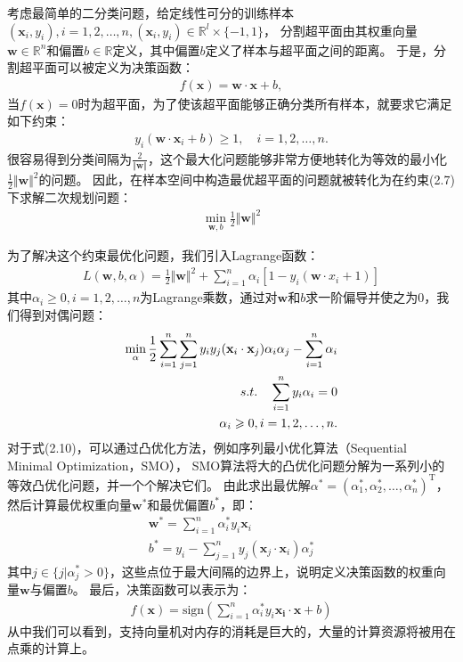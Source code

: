 考虑最简单的二分类问题，给定线性可分的训练样本$(\mathbf{x}_i,y_i),i=1,2,\ldots,n,(\mathbf{x}_i,y_i)\in\mathbb{R}^l\times\{-1,1\}$，
分割超平面由其权重向量$\mathbf{w}\in\mathbb{R}^n$和偏置$b\in\mathbb{R}$定义，其中偏置$b$定义了样本与超平面之间的距离。
于是，分割超平面可以被定义为决策函数：
\begin{align}
    f(\mathbf{x})=\mathbf{w}\cdot\mathbf{x}+b,
\end{align}
当$f(\mathbf{x})=0$时为超平面，为了使该超平面能够正确分类所有样本，就要求它满足如下约束：
\begin{align}
    y_i(\mathbf{w}\cdot\mathbf{x}_i+b)\geq1,\quad i=1,2,\ldots,n.
\end{align}
很容易得到分类间隔为$\frac{2}{\Vert\mathbf{w}\Vert}$，这个最大化问题能够非常方便地转化为等效的最小化$\frac{1}{2}\Vert\mathbf{w}\Vert^2$的问题。
因此，在样本空间中构造最优超平面的问题就被转化为在约束(2.7)下求解二次规划问题：
\begin{align}
    \min_{\mathbf{w},b}\frac{1}{2}\Vert\mathbf{w}\Vert^2
\end{align}

为了解决这个约束最优化问题，我们引入Lagrange函数：
\begin{align}
    L(\mathbf{w},b,\alpha)=\frac{1}{2}\Vert\mathbf{w}\Vert^2+\sum_{i=1}^n\alpha_i[1-y_i(\mathbf{w}\cdot x_i+1)]
\end{align}
其中$\alpha_i\geq0, i=1,2,\ldots,n$为Lagrange乘数，通过对$\mathbf{w}$和$b$求一阶偏导并使之为0，我们得到对偶问题：
\begin{align}
    \min_\alpha\frac{1}{2}\sum_{i=1}^n\sum_{j=1}^ny_iy_j(\mathbf{x}_i\cdot\mathbf{x}_j)\alpha_i\alpha_j-\sum_{i=1}^n\alpha_i \\
    s.t.\quad \sum_{i=1}^ny_i\alpha_i=0 \notag \\
    \alpha_i\geq0,i=1,2,\ldots,n.\notag
\end{align}
对于式(2.10)，可以通过凸优化方法，例如序列最小优化算法（Sequential Minimal Optimization，SMO），
SMO算法将大的凸优化问题分解为一系列小的等效凸优化问题，并一个个解决它们。
由此求出最优解$\alpha^*=(\alpha_1^*,\alpha_2^*,\ldots,\alpha_n^*)^\mathrm{T}$，
然后计算最优权重向量$\mathbf{w}^*$和最优偏置$b^*$，即：
\begin{align}
    \mathbf{w}^*=\sum_{i=1}^n\alpha_i^*y_i\mathbf{x}_i \\
    b^*=y_i-\sum_{j=1}^ny_j(\mathbf{x}_j\cdot\mathbf{x}_i)\alpha_j^*
\end{align}
其中$j\in\{j|\alpha_j^*>0\}$，这些点位于最大间隔的边界上，说明定义决策函数的权重向量$\mathbf{w}$与偏置$b$。
最后，决策函数可以表示为：
\begin{align}
    f(\mathbf{x})=\mathrm{sign}(\sum_{i=1}^n\alpha_i^*y_i\mathbf{x_i}\cdot\mathbf{x}+b)
\end{align}
从中我们可以看到，支持向量机对内存的消耗是巨大的，大量的计算资源将被用在点乘的计算上。

